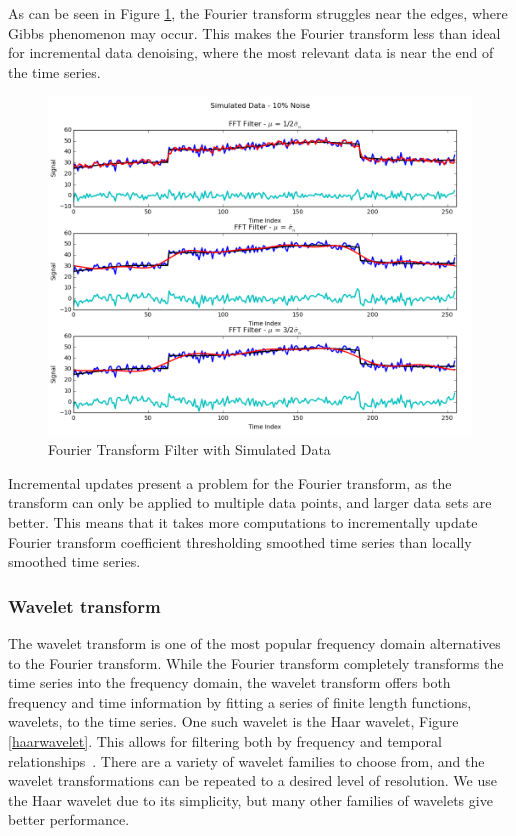 \documentclass[11pt]{article}
\theoremstyle{definition}
\begin{document}
As can be seen in Figure \ref{fftcompare}, the Fourier transform
struggles near the edges, where Gibbs phenomenon may occur. This makes
the Fourier transform less than ideal for incremental data denoising,
where the most relevant data is near the end of the time series.

\begin{figure}[h!]
\centering
\includegraphics[width = 0.9 \textwidth]{FFTCompare.png}
\caption{Fourier Transform Filter with Simulated Data}
\label{fftcompare}
\end{figure}

Incremental updates present a problem for the Fourier transform, as
the transform can only be applied to multiple data points, and larger data sets are better. This means that it takes more
computations to incrementally update Fourier transform coefficient
thresholding smoothed time series than locally smoothed time series.

\subsubsection{Wavelet transform} 
The wavelet transform is one of the most popular frequency domain
alternatives to the Fourier transform. While the Fourier transform
completely transforms the time series into the frequency domain, the
wavelet transform offers both frequency and time information by
fitting a series of finite length functions, wavelets, to the time
series. One such wavelet is the Haar wavelet, Figure
\ref{haarwavelet}. This allows for filtering both by frequency and
temporal relationships~\cite{Graps95}. There are a variety of wavelet
families to choose from, and the wavelet transformations can be
repeated to a desired level of resolution. We use the Haar wavelet due
to its simplicity, but many other families of wavelets give better
performance.
\end{document}
